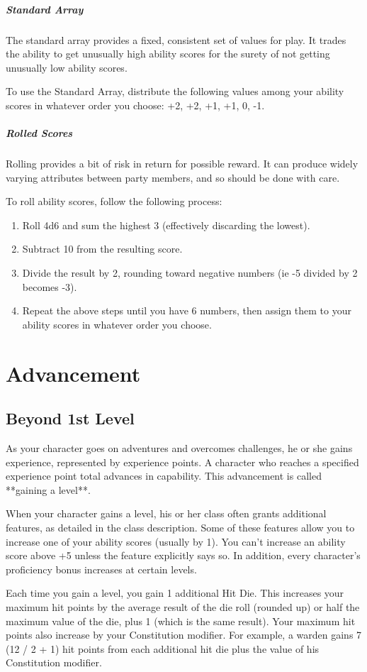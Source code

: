 \subparagraph*{Standard Array}
The standard array provides a fixed, consistent set of values for play. It trades the ability to get unusually high ability scores for the surety of not getting unusually low ability scores.

To use the Standard Array, distribute the following values among your ability scores in whatever order you choose: +2, +2, +1, +1, 0, -1.

\subparagraph*{Rolled Scores}
Rolling provides a bit of risk in return for possible reward. It can produce widely varying attributes between party members, and so should be done with care.

To roll ability scores, follow the following process:
\begin{enumerate}
	\item Roll 4d6 and sum the highest 3 (effectively discarding the lowest).
	\item Subtract 10 from the resulting score.
	\item Divide the result by 2, rounding toward negative numbers (ie -5 divided by 2 becomes -3).
	\item Repeat the above steps until you have 6 numbers, then assign them to your ability scores in whatever order you choose.
\end{enumerate}

\section{Advancement}\label{sec:advancement}
\subsection{Beyond 1st Level}\label{subsec:beyond-first-level}

As your character goes on adventures and overcomes challenges, he or she gains experience, represented by experience points. A character who reaches a specified experience point total advances in capability. This advancement is called **gaining a level**.

When your character gains a level, his or her class often grants additional features, as detailed in the class description. Some of these features allow you to increase one of your ability scores (usually by 1). You can't increase an ability score above +5 unless the feature explicitly says so. In addition, every character's proficiency bonus increases at certain levels.

Each time you gain a level, you gain 1 additional Hit Die. This increases your maximum hit points by the average result of the die roll (rounded up) or half the maximum value of the die, plus 1 (which is the same result). Your maximum hit points also increase by your Constitution modifier. For example, a warden gains 7 (12 / 2 + 1) hit points from each additional hit die plus the value of his Constitution modifier.

